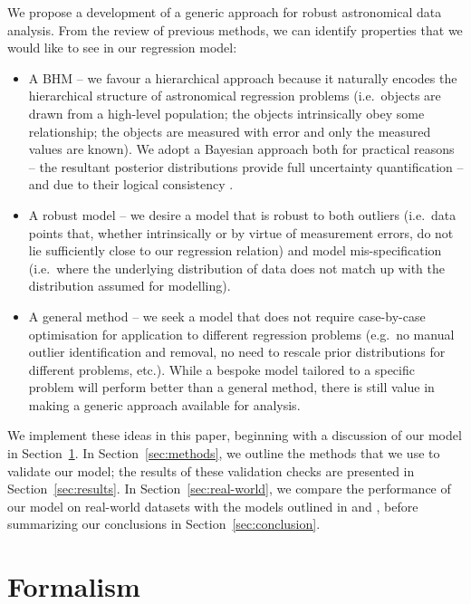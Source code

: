 \documentclass[fleqn,usenatbib]{rasti}
\begin{document}
We propose a development of a generic approach for robust astronomical data
analysis. From the review of previous methods, we can identify properties that
we would like to see in our regression model:

\begin{itemize}
	\item A BHM -- we favour a hierarchical approach because it naturally
	encodes the hierarchical structure of astronomical regression problems
	(i.e.\ objects are drawn from a high-level population; the objects
	intrinsically obey some relationship; the objects are measured with error
	and only the measured values are known). We adopt a Bayesian approach both
	for practical reasons -- the resultant posterior distributions provide full
	uncertainty quantification -- and due to their logical consistency
	\citep[e.g.][]{Cox:1946, vanHorn:2003, Knuth:2010}.

	\item A robust model -- we desire a model that is robust to both outliers
	(i.e.\ data points that, whether intrinsically or by virtue of measurement
	errors, do not lie sufficiently close to our regression relation) and model
	mis-specification (i.e.\ where the underlying distribution of data does not
	match up with the distribution assumed for modelling).

	\item A general method -- we seek a model that does not require case-by-case
	optimisation for application to different regression problems (e.g.\ no
	manual outlier identification and removal, no need to rescale prior
	distributions for different problems, etc.). While a bespoke model tailored
	to a specific problem will perform better than a general method, there is
	still value in making a generic approach available for analysis.
\end{itemize}

We implement these ideas in this paper, beginning with a discussion of our model
in Section~\ref{sec:formalism}. In Section~\ref{sec:methods}, we outline the
methods that we use to validate our model; the results of these validation
checks are presented in Section~\ref{sec:results}. In
Section~\ref{sec:real-world}, we compare the performance of our model on
real-world datasets with the models outlined in \citet{Kelly:2007} and
\citet{Park:2017}, before summarizing our conclusions in
Section~\ref{sec:conclusion}.

\section{Formalism}
\label{sec:formalism}
\end{document}
